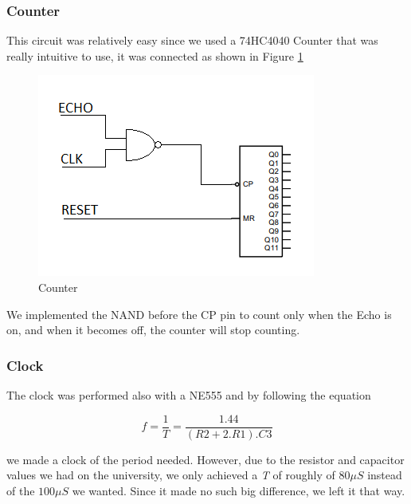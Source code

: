\subsubsection{Counter}

This circuit was relatively easy since we used a 74HC4040 Counter
that was really intuitive to use, it was connected as shown in Figure
\ref{8_7}

\begin{figure}[H]
\begin{centering}
\includegraphics[scale=0.7]{images/COUNTER}
\par\end{centering}
\caption{Counter}
\label{8_7}

\end{figure}

We implemented the NAND before the CP pin to count only when the Echo
is on, and when it becomes off, the counter will stop counting.

\subsubsection{Clock}

The clock was performed also with a NE555 and by following the equation

\[
f=\frac{1}{T}=\frac{1.44}{(R2+2.R1).C3}
\]

we made a clock of the period needed. However, due to the resistor
and capacitor values we had on the university, we only achieved a
\emph{T} of roughly of $80\mu S$ instead of the $100\mu S$ we wanted.
Since it made no such big difference, we left it that way.

